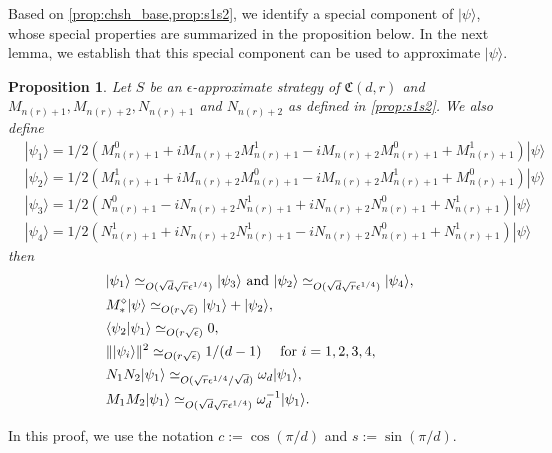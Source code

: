 \documentclass[11pt,letterpaper]{article}
\newcommand{\ket}[1]{|#1\rangle}
\newcommand{\braket}[2]{\langle#1|#2\rangle}
\DeclarePairedDelimiter{\norm}{\lVert}{\rVert}
\newcommand{\1}{\mathbb{1}}
\newcommand{\nr}{n(r)}
\newcommand{\fC}{\mathfrak{C}}
\newcommand{\ep}{\epsilon}
\newcommand{\se}{\sqrt{\epsilon}}
\newcommand{\qe}{\epsilon^{1/4}}
\newcommand{\sd}{\sqrt{d}}
\newcommand{\sr}{\sqrt{r}}
\newcommand{\appd}[1]{\simeq_{#1}}
\newtheorem{proposition}[theorem]{Proposition}
\theoremstyle{definition}
\begin{document}
Based on \cref{prop:chsh_base,prop:s1s2}, we identify a special component of $\ket{\psi}$, whose special properties are summarized
in the proposition below. In the next lemma, we establish that this special component can be used to approximate $\ket{\psi}$. 
\begin{proposition}
	Let $S$ be an $\ep$-approximate strategy of $\fC(d,r)$ and $M_{\nr+1}, M_{\nr+2},N_{\nr+1}$ and $N_{\nr+2}$ as defined in \cref{prop:s1s2}.
	We also define
	\begin{align}
		&\ket{\psi_1} =1/2(M_{\nr+1}^0 + iM_{\nr+2}M_{\nr+1}^1 - iM_{\nr+2}M_{\nr+1}^0 +M_{\nr+1}^1) \ket{\psi} \\
		&\ket{\psi_2} = 1/2(M_{\nr+1}^1 + iM_{\nr+2}M_{\nr+1}^0 -iM_{\nr+2}M_{\nr+1}^1 + M_{\nr+1}^0)  \ket{\psi} \\
		&\ket{\psi_3} =1/2 (N_{\nr+1}^0 - iN_{\nr+2}N_{\nr+1}^1+iN_{\nr+2}N_{\nr+1}^0 + N_{\nr+1}^1)\ket{\psi}\\
		&\ket{\psi_4} =1/2(N_{\nr+1}^1 + iN_{\nr+2}N_{\nr+1}^1 -iN_{\nr+2}N_{\nr+1}^0 + N_{\nr+1}^1)\ket{\psi}
	\end{align}
	then
	\begin{align}
	 \label{eq:psi1_eq} &\ket{\psi_1} \appd{O(\sd \sr\qe)} \ket{\psi_3} \text{ and } \ket{\psi_2} \appd{O(\sd \sr\qe)} \ket{\psi_4}, \\
	 \label{eq:psi1_sum} &M_\ast^\diamond \ket{\psi} \appd{O( r\se)} \ket{\psi_1}+\ket{\psi_2}, \\
	 \label{eq:psi1_orth} &\braket{\psi_2}{\psi_1} \appd{O( r\se)} 0,\\
	 \label{eq:psi1_norm} &\norm{\ket{\psi_i}}^2 \appd{O(r\se)} 1/(d-1) \quad \text{ for } i = 1, 2, 3, 4,\\
	 \label{eq:psi1_eig1} &N_1N_2 \ket{\psi_1} \appd{O(\sr \qe/\sd)} \omega_d\ket{\psi_1},\\
	 \label{eq:psi1_eig2} &M_1M_2 \ket{\psi_1} \appd{O(\sd\sr \qe)} \omega_d^{-1} \ket{\psi_1}.
	\end{align}
\end{proposition}
In this proof, we use the notation $c := \cos(\pi/d)$ and $s := \sin(\pi/d)$.
\end{document}
